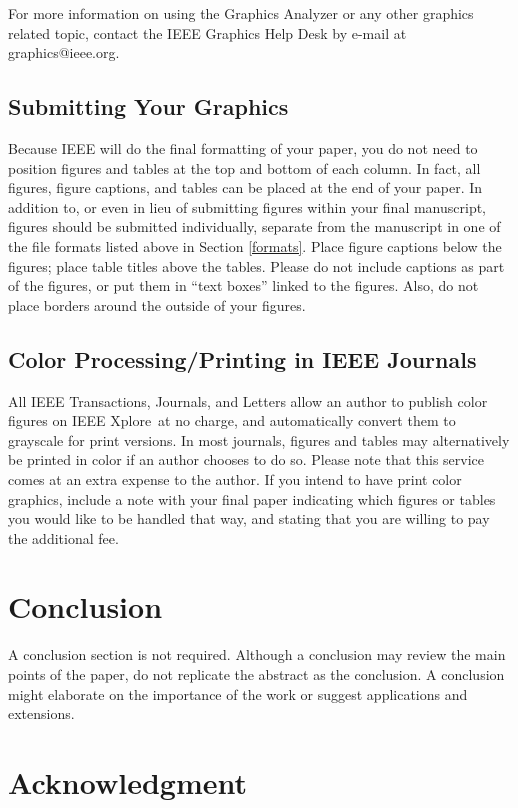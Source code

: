 \documentclass[journal]{IEEEtran}
\begin{document}
For more information on using the Graphics Analyzer or any other graphics 
related topic, contact the IEEE Graphics Help Desk by e-mail at 
graphics@ieee.org.

\subsection{Submitting Your Graphics}
Because IEEE will do the final formatting of your paper,
you do not need to position figures and tables at the top and bottom of each 
column. In fact, all figures, figure captions, and tables can be placed at 
the end of your paper. In addition to, or even in lieu of submitting figures 
within your final manuscript, figures should be submitted individually, 
separate from the manuscript in one of the file formats listed above in 
Section \ref{formats}. Place figure captions below the figures; place table titles 
above the tables. Please do not include captions as part of the figures, or 
put them in ``text boxes'' linked to the figures. Also, do not place borders 
around the outside of your figures.

\subsection{Color Processing/Printing in IEEE Journals}
All IEEE Transactions, Journals, and Letters allow an author to publish 
color figures on IEEE Xplore\textregistered\ at no charge, and automatically 
convert them to grayscale for print versions. In most journals, figures and 
tables may alternatively be printed in color if an author chooses to do so. 
Please note that this service comes at an extra expense to the author. If 
you intend to have print color graphics, include a note with your final 
paper indicating which figures or tables you would like to be handled that 
way, and stating that you are willing to pay the additional fee.


\section{Conclusion}

A conclusion section is not required. Although a conclusion may review the main points of the paper, do not replicate the abstract as the conclusion. A conclusion might elaborate on the importance of the work or suggest applications and extensions. 

\section*{Acknowledgment}
\end{document}
